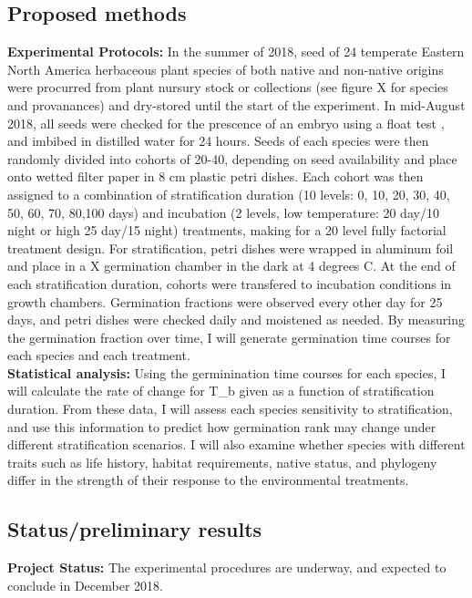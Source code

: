 \documentclass{article}\usepackage[]{graphicx}\usepackage[]{color}
\begin{document}
{\subsection*{Proposed methods}
\textbf{Experimental Protocols:} In the summer of 2018, seed of 24 temperate Eastern North America herbaceous plant species of both native and non-native origins were procurred from plant nursury stock or collections (see figure X for species and provanances) and dry-stored until the start of the experiment. In mid-August 2018, all seeds were checked for the prescence of an embryo using a float test \citep{Baskin2014}, and imbibed in distilled water for 24 hours. Seeds of each species were then randomly divided into cohorts of 20-40, depending on seed availability and place onto wetted filter paper in 8 cm plastic petri dishes. Each cohort was then assigned to a combination of stratification duration (10 levels: 0, 10, 20, 30, 40, 50, 60, 70, 80,100 days) and incubation (2 levels, low temperature: 20 day/10 night or high 25 day/15 night) treatments, making for a 20 level fully factorial treatment design. For stratification, petri dishes were wrapped in aluminum foil and place in a X germination chamber in the dark at 4 degrees C. At the end of each stratification duration, cohorts were transfered to incubation conditions in growth chambers. Germination fractions were observed every other day for 25 days, and petri dishes were checked daily and moistened as needed. By measuring the germination fraction over time, I will generate germination time courses for each species and each treatment.\\
\textbf{Statistical analysis:} Using the germinination time courses for each species, I will calculate the rate of change for T_b given as a function of stratification duration. From these data, I will assess each species sensitivity to stratification, and use this information to predict how germination rank may change under different stratification scenarios. I will also examine whether species with different traits such as life history, habitat requirements, native status, and phylogeny differ in the strength of their response to the environmental treatments.\\
\subsection{Status/preliminary results}
\textbf{Project Status:} The experimental procedures are underway, and expected to conclude in December 2018.\\
}
\end{document}
